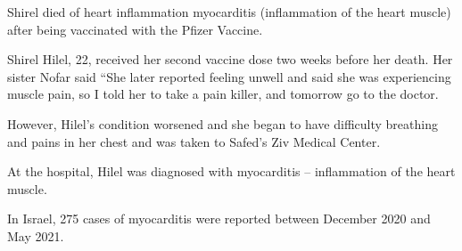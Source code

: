 Shirel died of heart inflammation myocarditis (inflammation of the heart muscle)
after being vaccinated with the Pfizer Vaccine.

Shirel Hilel, 22, received her second vaccine dose two weeks before her
death. Her sister Nofar said “She later reported feeling unwell and said she was
experiencing muscle pain, so I told her to take a pain killer, and tomorrow go
to the doctor.

However, Hilel’s condition worsened and she began to have difficulty breathing
and pains in her chest and was taken to Safed’s Ziv Medical Center.

At the hospital, Hilel was diagnosed with myocarditis – inflammation of the
heart muscle.

In Israel, 275 cases of myocarditis were reported between December 2020 and May
2021.

